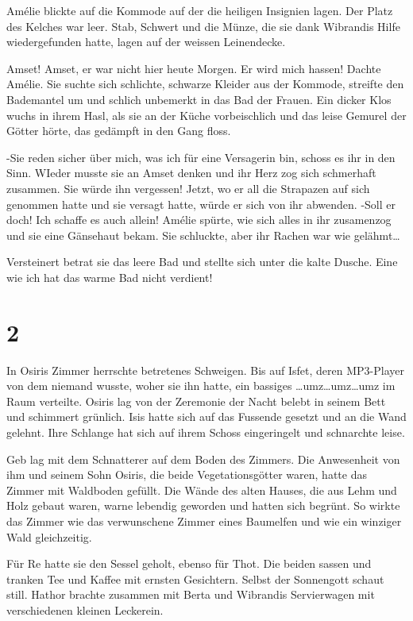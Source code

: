 Amélie blickte auf die Kommode auf der die heiligen Insignien lagen. Der Platz des Kelches war leer. Stab, Schwert und die Münze, die sie dank Wibrandis Hilfe wiedergefunden hatte, lagen auf der weissen Leinendecke.

Amset! Amset, er war nicht hier heute Morgen. Er wird mich hassen! Dachte Amélie. Sie suchte sich schlichte, schwarze Kleider aus der Kommode, streifte den Bademantel um und schlich unbemerkt in das Bad der Frauen. Ein dicker Klos wuchs in ihrem Hasl, als sie an der Küche vorbeischlich und das leise Gemurel der Götter hörte, das gedämpft in den Gang floss.

-Sie reden sicher über mich, was ich für eine Versagerin bin, schoss es ihr in den Sinn. WIeder musste sie an Amset denken und ihr Herz zog sich schmerhaft zusammen. Sie würde ihn vergessen! Jetzt, wo er all die Strapazen auf sich genommen hatte und sie versagt hatte, würde er sich von ihr abwenden. -Soll er doch! Ich schaffe es auch allein! Amélie spürte, wie sich alles in ihr zusamenzog und sie eine Gänsehaut bekam. Sie schluckte, aber ihr Rachen war wie gelähmt\dots

Versteinert betrat sie das leere Bad und stellte sich unter die kalte Dusche. Eine wie ich hat das warme Bad nicht verdient!

\section*{2}

In Osiris Zimmer herrschte betretenes Schweigen. Bis auf Isfet, deren MP3-Player von dem niemand wusste, woher sie ihn hatte, ein bassiges \dots umz\dots umz\dots umz im Raum verteilte. Osiris lag von der Zeremonie der Nacht belebt in seinem Bett und schimmert grünlich. Isis hatte sich auf das Fussende gesetzt und an die Wand gelehnt. Ihre Schlange hat sich auf ihrem Schoss eingeringelt und schnarchte leise.

Geb lag mit dem Schnatterer auf dem Boden des Zimmers. Die Anwesenheit von ihm und seinem Sohn Osiris, die beide Vegetationsgötter waren, hatte das Zimmer mit Waldboden gefüllt. Die Wände des alten Hauses, die aus Lehm und Holz gebaut waren, warne lebendig geworden und hatten sich begrünt. So wirkte das Zimmer wie das verwunschene Zimmer eines Baumelfen und wie ein winziger Wald gleichzeitig.

Für Re hatte sie den Sessel geholt, ebenso für Thot. Die beiden sassen und tranken Tee und Kaffee mit ernsten Gesichtern. Selbst der Sonnengott schaut still. Hathor brachte zusammen mit Berta und Wibrandis Servierwagen mit verschiedenen kleinen Leckerein. 

